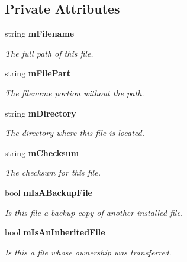 \subsection*{Private Attributes}
\begin{DoxyCompactItemize}
\item 
string {\bf mFilename}\label{classInstalledFile_a0711ddefa35381d3db54b74fc608b642}

\begin{DoxyCompactList}\small\item\em The full path of this file. \item\end{DoxyCompactList}\item 
string {\bf mFilePart}\label{classInstalledFile_aada62fd16c2ed19a5b090ae180c38521}

\begin{DoxyCompactList}\small\item\em The filename portion without the path. \item\end{DoxyCompactList}\item 
string {\bf mDirectory}\label{classInstalledFile_aa48fb1ef4521894c07cc748962467530}

\begin{DoxyCompactList}\small\item\em The directory where this file is located. \item\end{DoxyCompactList}\item 
string {\bf mChecksum}\label{classInstalledFile_ac92b113608f66295da78764e1464f631}

\begin{DoxyCompactList}\small\item\em The checksum for this file. \item\end{DoxyCompactList}\item 
bool {\bf mIsABackupFile}\label{classInstalledFile_a2795aa52985aa260fb765f6ef7eebb58}

\begin{DoxyCompactList}\small\item\em Is this file a backup copy of another installed file. \item\end{DoxyCompactList}\item 
bool {\bf mIsAnInheritedFile}\label{classInstalledFile_ac384a77efa70db13f78096f28aee4819}

\begin{DoxyCompactList}\small\item\em Is this a file whose ownership was transferred. \item\end{DoxyCompactList}\end{DoxyCompactItemize}


